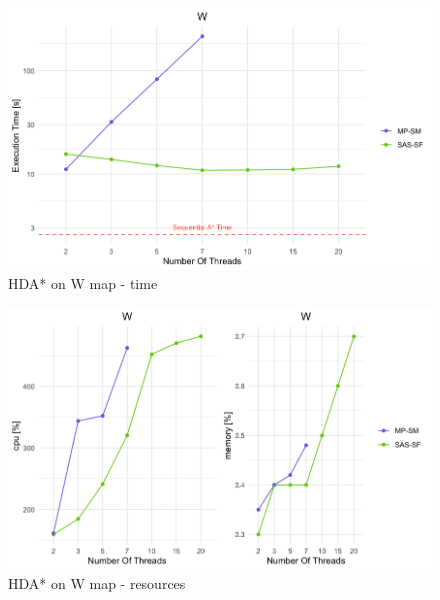 \documentclass[twocolumn, switch]{article} %
\begin{document}
\begin{figure}[ht!]
  \centering
  \includegraphics[width=1\linewidth]{hda/wtime.png}
  \caption{HDA* on W map - time}
  \label{cmpwtime}
\end{figure}
\begin{figure}[ht!]
  \centering
  \includegraphics[width=1\linewidth]{hda/wcpumem.png}
  \caption{HDA* on W map - resources}
  \label{cmpwcpumem}
\end{figure}
\end{document}
